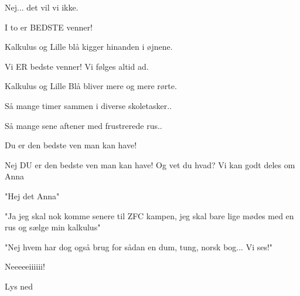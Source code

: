 \documentclass[a4paper,11pt]{article}
\begin{document}
\begin{sketch}
 Nej... det vil vi ikke. 

 I to er BEDSTE venner! 

\scene Kalkulus og Lille blå kigger hinanden i øjnene. 

 Vi ER bedste venner! Vi følges altid ad. 

\scene Kalkulus og Lille Blå bliver mere og mere rørte.

 Så mange timer sammen i diverse skoletasker.. 

 Så mange sene aftener med frustrerede rus.. 

 Du er den bedste ven man kan have! 

 Nej DU er den bedste ven man kan have! Og vet du hvad? Vi kan godt deles om Anna


 "Hej det Anna"


 "Ja jeg skal nok komme senere til ZFC kampen, jeg skal bare lige mødes med en rus og sælge min kalkulus"


 "Nej hvem har dog også brug for sådan en dum, tung, norsk bog... Vi ses!"

 Neeeeeiiiiii!

\scene Lys ned

\end{sketch}
\end{document}
